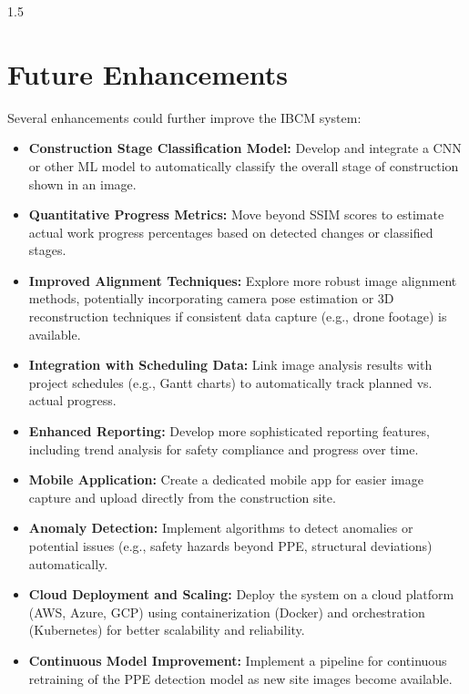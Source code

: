 \documentclass[12pt,a4paper]{report}
\begin{document}
\begin{spacing}{1.5}
    \section{Future Enhancements}
    Several enhancements could further improve the IBCM system:
    \begin{itemize}
        \item \textbf{Construction Stage Classification Model:} Develop and integrate a CNN or other ML model to automatically classify the overall stage of construction shown in an image.
        \item \textbf{Quantitative Progress Metrics:} Move beyond SSIM scores to estimate actual work progress percentages based on detected changes or classified stages.
        \item \textbf{Improved Alignment Techniques:} Explore more robust image alignment methods, potentially incorporating camera pose estimation or 3D reconstruction techniques if consistent data capture (e.g., drone footage) is available.
        \item \textbf{Integration with Scheduling Data:} Link image analysis results with project schedules (e.g., Gantt charts) to automatically track planned vs. actual progress.
        \item \textbf{Enhanced Reporting:} Develop more sophisticated reporting features, including trend analysis for safety compliance and progress over time.
        \item \textbf{Mobile Application:} Create a dedicated mobile app for easier image capture and upload directly from the construction site.
        \item \textbf{Anomaly Detection:} Implement algorithms to detect anomalies or potential issues (e.g., safety hazards beyond PPE, structural deviations) automatically.
        \item \textbf{Cloud Deployment and Scaling:} Deploy the system on a cloud platform (AWS, Azure, GCP) using containerization (Docker) and orchestration (Kubernetes) for better scalability and reliability.
        \item \textbf{Continuous Model Improvement:} Implement a pipeline for continuous retraining of the PPE detection model as new site images become available.
    \end{itemize}

\end{spacing}

{}
\end{document}

